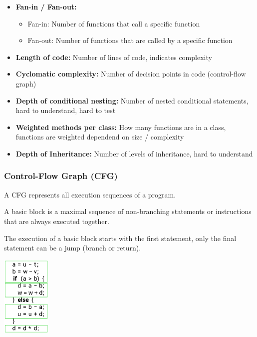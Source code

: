 \documentclass[
../../Software_Engineering_Summary.tex,
]
{subfiles}
\begin{document}
\begin{defbox}
    \begin{itemize}
        \item \textbf{Fan-in / Fan-out:} 
        \begin{itemize}
            \item Fan-in: Number of functions that call a specific function
            \item Fan-out: Number of functions that are called by a specific function
        \end{itemize}
        \item \textbf{Length of code:} Number of lines of code, indicates complexity
        \item \textbf{Cyclomatic complexity:} Number of decision points in code (control-flow graph)
        \item \textbf{Depth of conditional nesting:} Number of nested conditional statements, hard to understand, hard to test
        \item \textbf{Weighted methods per class:} How many functions are in a class, functions are weighted dependend on size / complexity
        \item \textbf{Depth of Inheritance:} Number of levels of inheritance, hard to understand
    \end{itemize}
\end{defbox}

\subsubsection{Control-Flow Graph (CFG)}
A CFG represents all execution sequences of a program.

\begin{defbox}
    A basic block is a maximal sequence of non-branching statements or instructions that are always executed together.

    The execution of a basic block starts with the first statement, only the final statement can be a jump (branch or return).

    \begin{center}
        \includegraphics[height=110pt]{Pics/BasicBlocksCFG.png}
    \end{center}
\end{defbox}
\end{document}
